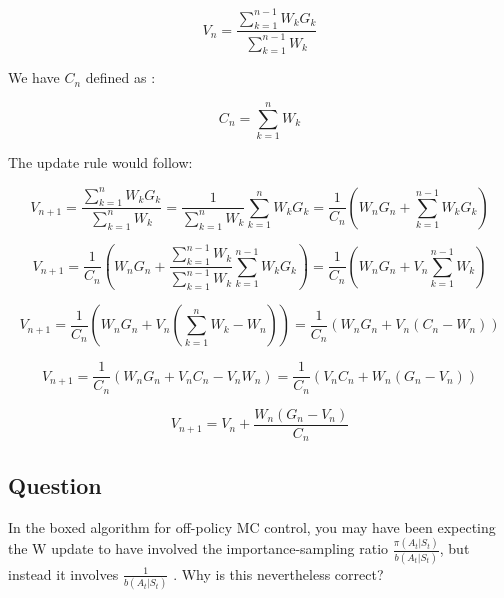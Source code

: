 \documentclass[11pt]{article}
\begin{document}
    \begin{equation}
        V_{n}= \frac{\sum_{k=1}^{n-1} W_{k} G_{k}}{\sum_{k=1}^{n-1} W_{k}}
    \end{equation}

    We have $C_n$ defined as :

    \begin{equation}
        C_{n}= \sum_{k=1}^{n} W_{k}
    \end{equation}

    The update rule would follow:

    \begin{equation}
        V_{n+1}=\frac{ \sum_{k=1}^{n} W_{k} G_{k}  }{ \sum_{k=1}^{n} W_{k} } = \frac{ 1 }{ \sum_{k=1}^{n} W_{k} } \sum_{k=1}^{n} W_{k} G_{k} = \frac{ 1 }{ C_{n} } ( W_{n} G_{n} +  \sum_{k=1}^{n - 1} W_{k} G_{k} )
    \end{equation}

    \begin{equation}
        V_{n+1} = \frac{ 1 }{ C_{n} } ( W_{n} G_{n} +  \frac{ \sum_{k=1}^{n-1} W_{k} }{ \sum_{k=1}^{n-1} W_{k} } \sum_{k=1}^{n - 1} W_{k} G_{k} ) = \frac{ 1 }{ C_{n} } ( W_{n} G_{n} + V_{n} \sum_{k=1}^{n-1} W_{k}  )
    \end{equation}

    \begin{equation}
        V_{n+1} = \frac{ 1 }{ C_{n} } ( W_{n} G_{n} + V_{n} (\sum_{k=1}^{n} W_{k} - W_{n}) ) = \frac{ 1 }{ C_{n} } ( W_{n} G_{n} + V_{n} (C_{n} - W_{n}) )
    \end{equation}

    \begin{equation}
        V_{n+1} = \frac{ 1 }{ C_{n} } ( W_{n} G_{n} + V_{n} C_{n} - V_{n}  W_{n} ) = \frac{ 1 }{ C_{n} } ( V_{n} C_{n} + W_{n} ( G_{n} - V_{n} ) )
    \end{equation}

    \begin{equation}
        V_{n+1} = V_{n} +  \frac{ W_{n} ( G_{n} - V_{n} ) }{ C_{n}}
    \end{equation}

    \subsection{Question}

    In the boxed algorithm for off-policy MC control, you may have been expecting the W update to have involved the importance-sampling ratio $ \frac{\pi(A_t|S_t)}{b(A_t|S_t)} $, but instead it involves $ \frac{ 1 }{b(A_t|S_t)} $ .
    Why is this nevertheless correct?
\end{document}
